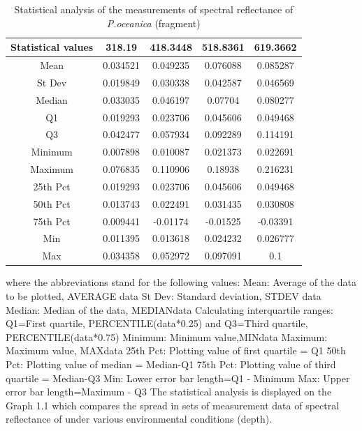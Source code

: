 \documentclass[11pt]{article}
\begin{document}
\begin{table}
\caption{Statistical analysis of the measurements of spectral reflectance of \textit{P.oceanica} (fragment)}
\centering
  \begin{tabular}{| c | c | c | c | c |}
    \hline
   	 \textbf{Statistical values} & \textbf{318.19} & \textbf{418.3448} & \textbf{518.8361} & \textbf{619.3662} \\ \hline \hline
	    Mean & 0.034521 & 0.049235 & 0.076088 & 0.085287 \\ \hline
	    St Dev & 0.019849 & 0.030338 & 0.042587 & 0.046569 \\ \hline
	   Median & 0.033035 & 0.046197 & 0.07704 & 0.080277 \\ \hline
	   Q1 & 0.019293 & 0.023706 & 0.045606& 0.049468 \\ \hline
	   Q3 & 0.042477 & 0.057934 & 0.092289 & 0.114191 \\ \hline
	   Minimum & 0.007898 & 0.010087 & 0.021373 & 0.022691 \\ \hline
	   Maximum & 0.076835 & 0.110906 & 0.18938 & 0.216231 \\ \hline
	   25th Pct & 0.019293 & 0.023706 & 0.045606 & 0.049468 \\ \hline
	   50th Pct & 0.013743 & 0.022491 & 0.031435 & 0.030808 \\ \hline
	   75th Pct & 0.009441 & -0.01174 & -0.01525 & -0.03391 \\ \hline
	   Min & 0.011395 & 0.013618 & 0.024232 & 0.026777 \\ \hline
	   Max & 0.034358 & 0.052972 & 0.097091 & 0.1 \\ \hline
  \end{tabular}
   \label{tab:4}
\end{table}

where the abbreviations stand for the following values:
Mean: Average of the data to be plotted, AVERAGE {data}
St Dev: Standard deviation, \ac{STDEV} {data}
Median: Median of the data, MEDIAN{data}
Calculating interquartile ranges: Q1=First quartile, PERCENTILE({data}*0.25) and Q3=Third
quartile, PERCENTILE({data}*0.75)
Minimum: Minimum value,MIN{data}
Maximum: Maximum value, MAX{data}
25th Pct: Plotting value of first quartile = Q1
50th Pct: Plotting value of median = Median-Q1
75th Pct: Plotting value of third quartile = Median-Q3
Min: Lower error bar length=Q1 - Minimum
Max: Upper error bar length=Maximum - Q3
The statistical analysis is displayed on the Graph 1.1 which compares the spread in sets of
measurement data of spectral reflectance of under various environmental conditions (depth).
\end{document}
